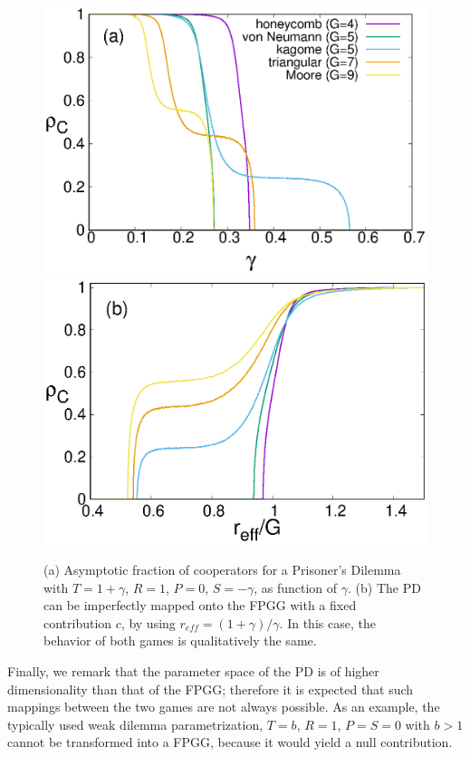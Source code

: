 \documentclass[5p,review]{elsarticle}
\begin{document}
%   
\begin{figure}[t]
    \centering
{\includegraphics[width=\linewidth]{figs/PD_reff_7a.eps}}
{\includegraphics[width=\columnwidth]{figs/PD_reff_7b.eps}}
    \caption{(a) Asymptotic fraction of cooperators for a Prisoner's Dilemma with $T=1+\gamma$, $R=1$, $P=0$, $S=-\gamma$, as function of $\gamma$.  (b) The PD can be imperfectly mapped onto the FPGG with a fixed contribution $c$, by using $r_{eff}=(1+\gamma)/\gamma$. In this case, the behavior of both games is qualitatively the same.
     }
    \label{pd}
\end{figure}
%

Finally,  we remark that the parameter space of the PD is of higher dimensionality than that of the FPGG; therefore it is expected that such mappings between the two games are not always possible. As an example, the typically used weak dilemma parametrization, $T = b$, $R = 1$, $P = S = 0$ with $b>1$ cannot be transformed into a FPGG, because it would yield a null contribution.
\end{document}
